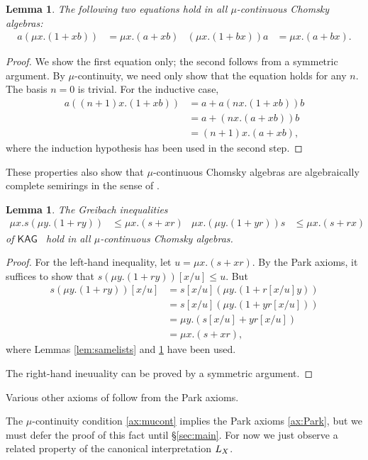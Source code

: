 \documentclass[copyright,creativecommons]{eptcs}
\newtheorem{lemma}[theorem]{Lemma}
\theoremstyle{remark}
\newcommand\subst[2]{[#1/#2]}
\newcommand\mathname[1]{\ensuremath{\mathsf{#1}}}
\newcommand\KAG{\mathname{KAG}}
\begin{document}
\begin{lemma}\label{lem:listdistr}
The following two equations hold in all $\mu$-continuous Chomsky algebras:
\begin{align*}
a(\mu x.(1+xb)) &= \mu x.(a+xb) & (\mu x.(1+bx))a &= \mu x.(a+bx).
\end{align*}
\end{lemma}
\begin{proof}
We show the first equation only; the second follows from a
symmetric argument.  By $\mu$-continuity, we need only show that the
equation holds for any $n$.  The basis $n=0$ is trivial.  For the inductive case,
\begin{align*}
a((n{+}1)x.(1+xb)) &= a + a(nx.(1+xb))b \\
&= a + (nx.(a+xb))b \\
&= (n{+}1)x.(a+xb),
\end{align*}
where the induction hypothesis has been used in the second step.
\end{proof}
These properties also show that $\mu$-continuous Chomsky algebras are algebraically complete semirings in the sense of \cite{esle2002,EsikLeiss05}.
\begin{lemma}
The \emph{Greibach inequalities}
\begin{align*}
\mu x.s(\mu y.(1+ry)) &\leq \mu x.(s+xr) &
\mu x.(\mu y.(1+yr))s &\leq \mu x.(s+rx)
\end{align*}
of \KAG~{\upshape\cite{leiss92b}} hold in all $\mu$-continuous Chomsky algebras.
\end{lemma}
\begin{proof}
For the left-hand inequality, let $u=\mu x.(s+xr)$. By the Park axioms, it suffices to show that $s(\mu y.(1+ry))\subst xu \leq u$. But
\begin{align*}
s(\mu y.(1+ry))\subst xu &= s\subst xu(\mu y.(1+r\subst xu y)) \\
&= s\subst xu (\mu y.(1+yr\subst xu)) \\
&= \mu y.(s\subst xu + yr\subst xu) \\
&= \mu x.(s+xr),
\end{align*}
where Lemmas \ref{lem:samelists} and \ref{lem:listdistr} have been used.

The right-hand ineuuality can be proved by a symmetric argument.
\end{proof}

Various other axioms of \cite{esle2002,EsikLeiss05,leiss92b} follow from the Park axioms.

The $\mu$-continuity condition \eqref{ax:mucont} implies the Park axioms \eqref{ax:Park}, but we must defer the proof of this fact until \S\ref{sec:main}. For now we just observe a related property of the canonical interpretation $L_{X}$.
\end{document}
